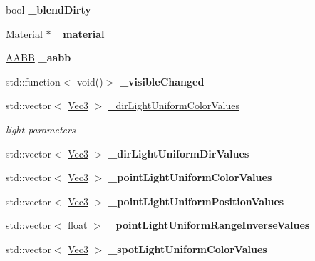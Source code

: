 \begin{DoxyCompactItemize}
\mbox{\label{classMesh_adcdaa3d8c53b3b5bcb24e929e35955e2}} 
bool {\bfseries \+\_\+blend\+Dirty}
\item 
\mbox{\label{classMesh_ac10f868100cb08d6286c82a4339af8ce}} 
\hyperlink{classMaterial}{Material} $\ast$ {\bfseries \+\_\+material}
\item 
\mbox{\label{classMesh_a57be715ca67775ad833f6ed0099100fc}} 
\hyperlink{classAABB}{A\+A\+BB} {\bfseries \+\_\+aabb}
\item 
\mbox{\label{classMesh_a2719ad503ea85e855f89b854f3e86162}} 
std\+::function$<$ void()$>$ {\bfseries \+\_\+visible\+Changed}
\item 
\mbox{\label{classMesh_a54cf8930e8c06ce530c870996d409c27}} 
std\+::vector$<$ \hyperlink{classVec3}{Vec3} $>$ \hyperlink{classMesh_a54cf8930e8c06ce530c870996d409c27}{\+\_\+dir\+Light\+Uniform\+Color\+Values}
\begin{DoxyCompactList}\small\item\em light parameters \end{DoxyCompactList}\item 
\mbox{\label{classMesh_acea92f2f8e1cfefd6139663ce74c30db}} 
std\+::vector$<$ \hyperlink{classVec3}{Vec3} $>$ {\bfseries \+\_\+dir\+Light\+Uniform\+Dir\+Values}
\item 
\mbox{\label{classMesh_a4623a49fde6433fe620cd670c8878319}} 
std\+::vector$<$ \hyperlink{classVec3}{Vec3} $>$ {\bfseries \+\_\+point\+Light\+Uniform\+Color\+Values}
\item 
\mbox{\label{classMesh_ad060df601303df666a4f23ce1898705e}} 
std\+::vector$<$ \hyperlink{classVec3}{Vec3} $>$ {\bfseries \+\_\+point\+Light\+Uniform\+Position\+Values}
\item 
\mbox{\label{classMesh_af1fff4b21c4d4cb58c3ec53ed8bc0e24}} 
std\+::vector$<$ float $>$ {\bfseries \+\_\+point\+Light\+Uniform\+Range\+Inverse\+Values}
\item 
\mbox{\label{classMesh_a5157754defbcd6cb5c6f85f13447501b}} 
std\+::vector$<$ \hyperlink{classVec3}{Vec3} $>$ {\bfseries \+\_\+spot\+Light\+Uniform\+Color\+Values}

\end{DoxyCompactItemize}
